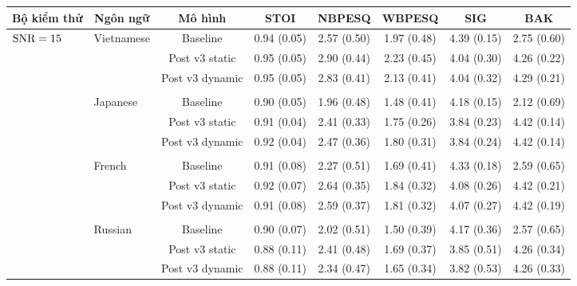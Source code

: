 		\begin{sidewaystable} \ContinuedFloat
			\centering
			\begin{subtable}{\textwidth}
				\centering
				\begin{tabular}{llcccccc}
					\hline
					\multicolumn{1}{c}{\textbf{Bộ kiểm thử}}	& \multicolumn{1}{c}{\textbf{Ngôn ngữ}}	& \textbf{Mô hình}	& \textbf{STOI}	& \textbf{NBPESQ}	& \textbf{WBPESQ}	& \textbf{SIG}	& \textbf{BAK} \\
					\hline
					\multirow{27}{*}{$\text{SNR}=15$}       & \multirow{3}{*}{Vietnamese}     &Baseline       & 0.94 (0.05)   & 2.57 (0.50)   & 1.97 (0.48)   & 4.39 (0.15)   & 2.75 (0.60) \\
					&               &Post v3 static & 0.95 (0.05)   & 2.90 (0.44)   & 2.23 (0.45)   & 4.04 (0.30)   & 4.26 (0.22) \\
					&				&Post v3 dynamic        & 0.95 (0.05)   & 2.83 (0.41)   & 2.13 (0.41)   & 4.04 (0.32)   & 4.29 (0.21) \\
					&&&&&&&\\
					& \multirow{3}{*}{Japanese}     &Baseline       & 0.90 (0.05)   & 1.96 (0.48)   & 1.48 (0.41)   & 4.18 (0.15)   & 2.12 (0.69) \\
					&               &Post v3 static & 0.91 (0.04)   & 2.41 (0.33)   & 1.75 (0.26)   & 3.84 (0.23)   & 4.42 (0.14) \\
					&               &Post v3 dynamic        & 0.92 (0.04)   & 2.47 (0.36)   & 1.80 (0.31)   & 3.84 (0.24)   & 4.42 (0.14) \\
					&&&&&&&\\
					& \multirow{3}{*}{French}       &Baseline       & 0.91 (0.08)   & 2.27 (0.51)   & 1.69 (0.41)   & 4.33 (0.18)   & 2.59 (0.65) \\
					&               &Post v3 static & 0.92 (0.07)   & 2.64 (0.35)   & 1.84 (0.32)   & 4.08 (0.26)   & 4.42 (0.21) \\
					&               &Post v3 dynamic        & 0.91 (0.08)   & 2.59 (0.37)   & 1.81 (0.32)   & 4.07 (0.27)   & 4.42 (0.19) \\
					&&&&&&&\\
					& \multirow{3}{*}{Russian}      &Baseline       & 0.90 (0.07)   & 2.02 (0.51)   & 1.50 (0.39)   & 4.17 (0.36)   & 2.57 (0.65) \\
					&               &Post v3 static & 0.88 (0.11)   & 2.41 (0.48)   & 1.69 (0.37)   & 3.85 (0.51)   & 4.26 (0.34) \\
					&               &Post v3 dynamic        & 0.88 (0.11)   & 2.34 (0.47)   & 1.65 (0.34)   & 3.82 (0.53)   & 4.26 (0.33) \\

\end{tabular}
\end{subtable}
\end{sidewaystable}
